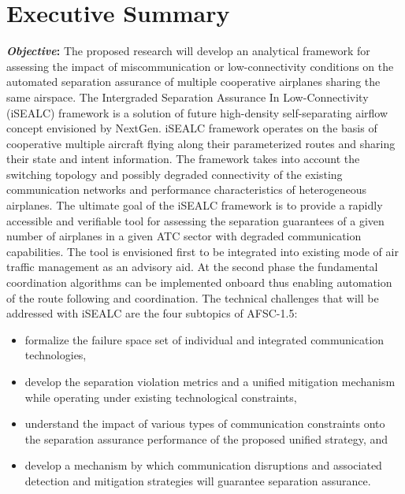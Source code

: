 \documentclass[letter,onecolumn,12pt]{aiaa-tc}
\newcommand{\1}{1_n}
\begin{document}
\pagestyle{empty}
\section*{Executive Summary}  %

\textbf{\emph{Objective}:} The proposed research will develop an analytical framework for assessing the impact of miscommunication or low-connectivity conditions on the automated separation assurance of multiple cooperative airplanes sharing the same airspace. The Intergraded Separation Assurance In Low-Connectivity (iSEALC) framework is a solution of future high-density self-separating airflow concept envisioned by NextGen. iSEALC framework operates on the basis of cooperative multiple aircraft flying along their parameterized routes and sharing their state and intent information. The framework takes into account the switching topology and possibly degraded connectivity of the existing communication networks and performance characteristics of heterogeneous airplanes. The ultimate goal of the iSEALC framework is to provide a rapidly accessible and verifiable tool for assessing the separation guarantees of a given number of airplanes in a given ATC sector with degraded communication capabilities. The tool is  envisioned first to be integrated into existing mode of air traffic management as an advisory aid. At the second phase the fundamental coordination algorithms can be implemented onboard thus enabling automation of the route following and coordination. The technical challenges that will be addressed with iSEALC are the four subtopics of AFSC-1.5:
\vspace{-2mm}
\begin{itemize}
\setlength{\itemsep}{-4pt}
    \item formalize the failure space set of individual and integrated communication technologies,
    \item develop the separation violation metrics and a unified mitigation mechanism while operating under existing technological constraints,
    \item understand the impact of various types of communication constraints onto the separation assurance performance of the proposed unified strategy, and
    \item develop a mechanism by which communication disruptions and associated detection and mitigation strategies will guarantee separation assurance.
\end{itemize}
\end{document}
